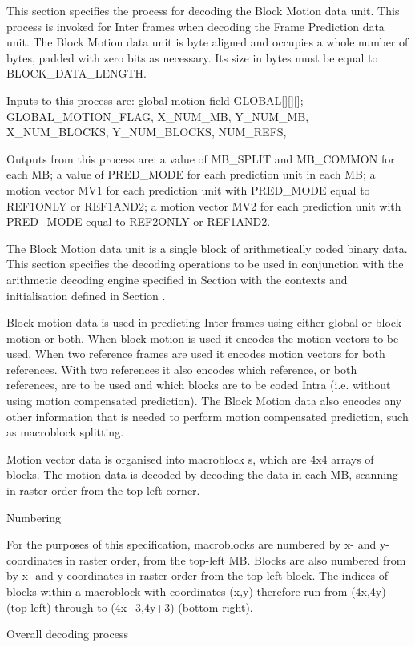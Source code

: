 This section specifies the process for decoding the Block Motion data
unit. This process is invoked for Inter frames when decoding the Frame
Prediction data unit. The Block Motion data unit is byte aligned and
occupies a whole number of bytes, padded with zero bits as necessary.
Its size in bytes must be equal to BLOCK\_DATA\_LENGTH.

Inputs to this process are: global motion field GLOBAL[][][];
GLOBAL\_MOTION\_FLAG, X\_NUM\_MB, Y\_NUM\_MB, X\_NUM\_BLOCKS, Y\_NUM\_BLOCKS,
NUM\_REFS, 

Outputs from this process are: a value of MB\_SPLIT and MB\_COMMON for
each MB; a value of PRED\_MODE for each prediction unit in each MB; a
motion vector MV1 for each prediction unit with PRED\_MODE equal to
REF1ONLY or REF1AND2; a motion vector MV2 for each prediction unit with
PRED\_MODE equal to REF2ONLY or REF1AND2.

The Block Motion data unit is a single block of arithmetically coded
binary data. This section specifies the decoding operations to be used
in conjunction with the arithmetic decoding engine specified in Section
with the contexts and initialisation defined in Section .

Block motion data is used in predicting Inter frames using either global
or block motion or both. When block motion is used it encodes the motion
vectors to be used. When two reference frames are used it encodes motion
vectors for both references. With two references it also encodes which
reference, or both references, are to be used and which blocks are to be
coded Intra (i.e. without using motion compensated prediction). The
Block Motion data also encodes any other information that is needed to
perform motion compensated prediction, such as macroblock  splitting.

Motion vector data is organised into macroblock s, which are 4x4 arrays
of blocks. The motion data is decoded by decoding the data in each MB,
scanning in raster order from the top-left corner. 

Numbering

For the purposes of this specification, macroblocks  are numbered by x-
and y- coordinates in raster order, from the top-left MB. Blocks are
also numbered from by x- and y-coordinates in raster order from the
top-left block. The indices of blocks within a macroblock with
coordinates (x,y) therefore run from (4x,4y) (top-left) through to
(4x+3,4y+3) (bottom right). 

Overall decoding process

